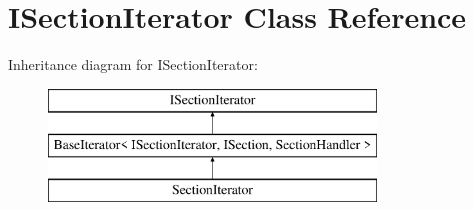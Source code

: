\hypertarget{class_i_section_iterator}{}\section{I\+Section\+Iterator Class Reference}
\label{class_i_section_iterator}
Inheritance diagram for I\+Section\+Iterator\+:\begin{figure}[H]
\begin{center}
\leavevmode
\includegraphics[height=3.000000cm]{class_i_section_iterator}
\end{center}
\end{figure}
